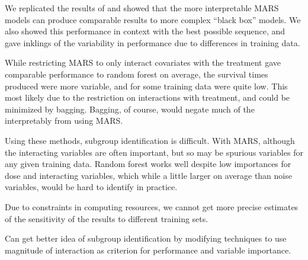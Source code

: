 \documentclass[12pt]{article}
\begin{document}
We replicated the results of \textcite{crt} and showed that the more interpretable MARS models can produce comparable results to more complex ``black box'' models. We also showed this performance in context with the best possible sequence, and gave inklings of the variability in performance due to differences in training data.

While restricting MARS to only interact covariates with the treatment gave comparable performance to random forest on average, the survival times produced were more variable, and for some training data were quite low. This most likely due to the restriction on interactions with treatment, and could be minimized by bagging. Bagging, of course, would negate much of the interpretably from using MARS.

Using these methods, subgroup identification is difficult. With MARS, although the interacting variables are often important, but so may be spurious variables for any given training data. Random forest works well despite low importances for dose and interacting variables, which while a little larger on average than noise variables, would be hard to identify in practice.

Due to constraints in computing resources, we cannot get more precise estimates of the sensitivity of the results to different training sets.

Can get better idea of subgroup identification by modifying techniques to use magnitude of interaction as criterion for performance and variable importance. 


\printbibliography
\end{document}
